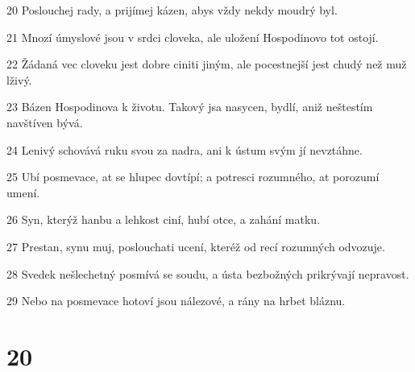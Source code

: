 \par 20 Poslouchej rady, a prijímej kázen, abys vždy nekdy moudrý byl.
\par 21 Mnozí úmyslové jsou v srdci cloveka, ale uložení Hospodinovo tot ostojí.
\par 22 Žádaná vec cloveku jest dobre ciniti jiným, ale pocestnejší jest chudý než muž lživý.
\par 23 Bázen Hospodinova k životu. Takový jsa nasycen, bydlí, aniž neštestím navštíven bývá.
\par 24 Lenivý schovává ruku svou za nadra, ani k ústum svým jí nevztáhne.
\par 25 Ubí posmevace, at se hlupec dovtípí; a potresci rozumného, at porozumí umení.
\par 26 Syn, kterýž hanbu a lehkost ciní, hubí otce, a zahání matku.
\par 27 Prestan, synu muj, poslouchati ucení, kteréž od recí rozumných odvozuje.
\par 28 Svedek nešlechetný posmívá se soudu, a ústa bezbožných prikrývají nepravost.
\par 29 Nebo na posmevace hotoví jsou nálezové, a rány na hrbet bláznu.

\chapter{20}

